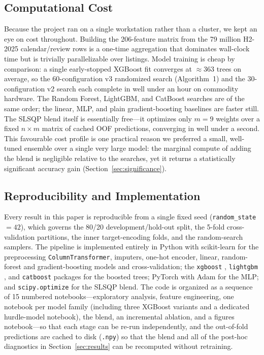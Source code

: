 \documentclass[journal]{IEEEtran}
\begin{document}
\subsection{Computational Cost}
\label{sec:cost}
Because the project ran on a single workstation rather than a cluster, we kept
an eye on cost throughout. Building the 206-feature matrix from the 79 million
H2-2025 calendar/review rows is a one-time aggregation that dominates
wall-clock time but is trivially parallelizable over listings. Model training
is cheap by comparison: a single early-stopped XGBoost fit converges at
$\approx$363 trees on average, so the 60-configuration v3 randomized search
(Algorithm~1) and the 30-configuration v2 search each complete in well under
an hour on commodity hardware. The Random Forest, LightGBM, and CatBoost
searches are of the same order; the linear, MLP, and plain gradient-boosting
baselines are faster still. The SLSQP blend itself is essentially
free---it optimizes only $m=9$ weights over a fixed $n\times m$ matrix of
cached OOF predictions, converging in well under a second. This favourable cost
profile is one practical reason we preferred a small, well-tuned ensemble over a
single very large model: the marginal compute of adding the blend is negligible
relative to the searches, yet it returns a statistically significant accuracy
gain (Section~\ref{sec:significance}).

\subsection{Reproducibility and Implementation}
\label{sec:repro}
Every result in this paper is reproducible from a single fixed seed
(\texttt{random\_state}~$=42$), which governs the 80/20 development/hold-out
split, the 5-fold cross-validation partitions, the inner target-encoding folds,
and the random-search samplers. The pipeline is implemented entirely in Python
with scikit-learn \cite{pedregosa2011sklearn} for the preprocessing
\texttt{ColumnTransformer}, imputers, one-hot encoder, linear, random-forest and
gradient-boosting models and cross-validation; the \texttt{xgboost}
\cite{chen2016xgboost}, \texttt{lightgbm} \cite{ke2017lightgbm}, and
\texttt{catboost} \cite{prokhorenkova2018catboost} packages for the boosted
trees; PyTorch \cite{paszke2019pytorch} with Adam \cite{kingma2015adam} for the
MLP; and \texttt{scipy.optimize} for the SLSQP blend. The code is organized as
a sequence of 15 numbered notebooks---exploratory analysis, feature
engineering, one notebook per model family (including three XGBoost variants
and a dedicated hurdle-model notebook), the blend, an incremental ablation, and
a figures notebook---so that each stage can be re-run independently, and the
out-of-fold predictions are cached to disk (\texttt{.npy}) so that the blend
and all of the post-hoc diagnostics in Section~\ref{sec:results} can be
recomputed without retraining.
\end{document}

